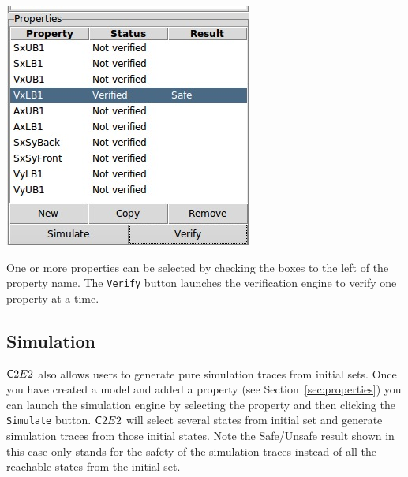\documentclass{tufte-book} %
\begin{document}
\begin{marginfigure}
 \centerline{\includegraphics[scale=.25,keepaspectratio=true]{Figures/verified.png}}
 \caption{One or more properties can be selected by checking the boxes to the left of the property name. The \texttt{Verify} button launches the verification engine to verify one property at a time.} 
 \label{fig:safe}
\end{marginfigure}


\subsection{Simulation}
${{\mathsf C2E2}}$ also allows users to generate pure simulation traces from initial sets. Once you have created a model and added a property (see Section~\ref{sec:properties}) you can launch the simulation engine by selecting the property and then clicking the \texttt{Simulate} button. ${{\mathsf C2E2}}$ will select several states from initial set and generate simulation traces from those initial states. Note the Safe/Unsafe result shown in this case only stands for the safety of the simulation traces instead of all the reachable states from the initial set.
\end{document}
